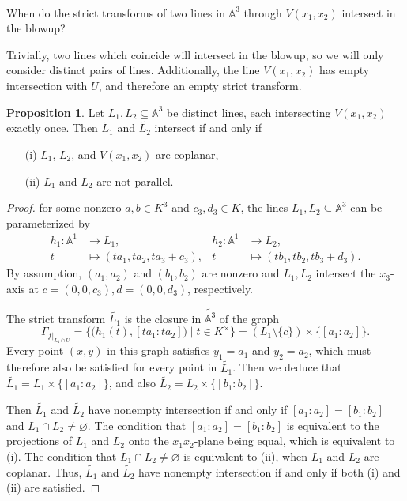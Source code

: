 \documentclass[12pt]{article}
\newenvironment{fullbox}{\begin{lrbox}{\savefullbox}\begin{minipage}{\dimexpr\textwidth-2\fboxsep\relax}}{\end{minipage}\end{lrbox}\begin{center}\framebox[\textwidth]{\usebox{\savefullbox}}\end{center}}
\newenvironment{pbox}[1][]{\begin{fullbox}\ifx#1\empty\else\paragraph{#1}\fi}{\end{fullbox}}
\theoremstyle{definition}
\newtheorem{proposition}{Proposition}
\renewcommand{\emptyset}{\varnothing}
\newcommand{\<}{\langle}
\renewcommand{\>}{\rangle}
\newcommand{\A}{\mathbb{A}}
\newcommand{\blow}{\widetilde}
\begin{document}
\newpage
\begin{pbox}
    When do the strict transforms of two lines in $\A^3$ through $V(x_1, x_2)$ intersect in the blowup?
\end{pbox}

Trivially, two lines which coincide will intersect in the blowup, so we will only consider distinct pairs of lines. Additionally, the line $V(x_1, x_2)$ has empty intersection with $U$, and therefore an empty strict transform.

\begin{proposition}
    Let $L_1, L_2 \subseteq \A^3$ be distinct lines, each intersecting $V(x_1, x_2)$ exactly once. Then $\blow{L_1}$ and $\blow{L_2}$ intersect if and only if
    \begin{itemize}
        \item[(i)] $L_1$, $L_2$, and $V(x_1, x_2)$ are coplanar,
        \item[(ii)] $L_1$ and $L_2$ are not parallel.
    \end{itemize}
\end{proposition}

\begin{proof}
    for some nonzero $a, b \in K^3$ and $c_3, d_3 \in K$, the lines $L_1, L_2 \subseteq \A^3$ can be parameterized by
    \begin{align*}
        h_1 : \A^1 &\to L_1,        &               h_2 : \A^1 &\to L_2, \\
            t &\mapsto (t a_1, t a_2, t a_3 + c_3),   &   t &\mapsto (t b_1, t b_2, t b_3 + d_3).
    \end{align*}
    By assumption, $(a_1, a_2)$ and $(b_1, b_2)$ are nonzero and $L_1, L_2$ intersect the $x_3$-axis at $c = (0, 0, c_3), d = (0, 0, d_3)$, respectively.

    The strict transform $\blow{L_1}$ is the closure in $\blow{\A^3}$ of the graph
    \[
        \Gamma_{f|_{L_1 \cap U}}
            = \{\big(h_1(t), [ta_1 : ta_2]\big) \mid t \in K^\times\}
            = (L_1 \setminus \{c\}) \times \{[a_1 : a_2]\}.
    \]
    Every point $(x, y)$ in this graph satisfies $y_1 = a_1$ and $y_2 = a_2$, which must therefore also be satisfied for every point in $\blow{L_1}$. Then we deduce that $\blow{L_1} = L_1 \times \{[a_1 : a_2]\}$, and also $\blow{L_2} = L_2 \times \{[b_1 : b_2]\}$.

    Then $\blow{L_1}$ and $\blow{L_2}$ have nonempty intersection if and only if $[a_1 : a_2] = [b_1 : b_2]$ and $L_1 \cap L_2 \ne \emptyset$. The condition that $[a_1 : a_2] = [b_1 : b_2]$ is equivalent to the projections of $L_1$ and $L_2$ onto the $x_1x_2$-plane being equal, which is equivalent to (i). The condition that $L_1 \cap L_2 \ne \emptyset$ is equivalent to (ii), when $L_1$ and $L_2$ are coplanar. Thus, $\blow{L_1}$ and $\blow{L_2}$ have nonempty intersection if and only if both (i) and (ii) are satisfied.


\end{proof}
\end{document}
